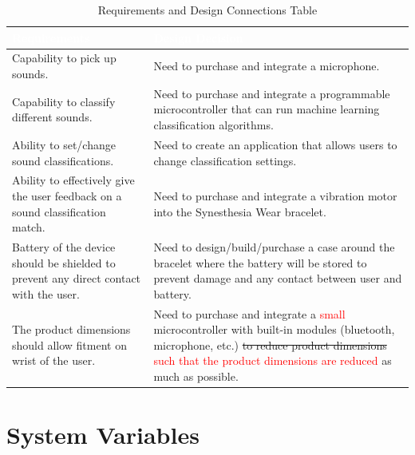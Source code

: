\documentclass[12pt, titlepage]{article}
\begin{document}
\begin{table}[H]
  \centering
  \caption{Requirements and Design Connections Table}
  \label{table:Connections Table} 
  \begin{tabular}{|p{7cm}|p{7cm}|} 
  \hline
  \rowcolor[rgb]{0.071,0.49,0.698} \textcolor{white}{Requirements} & \textcolor{white}{Design Decision}                                          \\ 
  \hline
  \rowcolor[rgb]{0.675,0.827,0.902} Capability to pick up sounds.              & Need to purchase and integrate a microphone.\\
  \hline
  \rowcolor[rgb]{0.675,0.827,0.902} Capability to classify different sounds.              & Need to purchase and integrate a programmable microcontroller that can run machine learning classification algorithms.\\
  \hline
  \rowcolor[rgb]{0.675,0.827,0.902} Ability to set/change sound classifications.            & Need to create an application that allows users to change classification settings.\\    
  \hline
  \rowcolor[rgb]{0.675,0.827,0.902} Ability to effectively give the user feedback on a sound classification match.           & Need to purchase and integrate a vibration motor into the Synesthesia Wear bracelet.\\
  \hline
  \rowcolor[rgb]{0.675,0.827,0.902} Battery of the device should be shielded to prevent any direct contact with the user.           & Need to design/build/purchase a case around the bracelet where the battery will be stored to prevent damage and any contact between user and battery.\\
  \hline
  \rowcolor[rgb]{0.675,0.827,0.902} The product dimensions should allow fitment on wrist of the user.           & Need to purchase and integrate a \textcolor{red}{small} microcontroller with built-in modules (bluetooth, microphone, etc.) \sout{to reduce product dimensions} \textcolor{red}{such that the product dimensions are reduced} as much as possible.\\
  \hline
  \end{tabular}
\end{table}

\section{System Variables}
\end{document}
